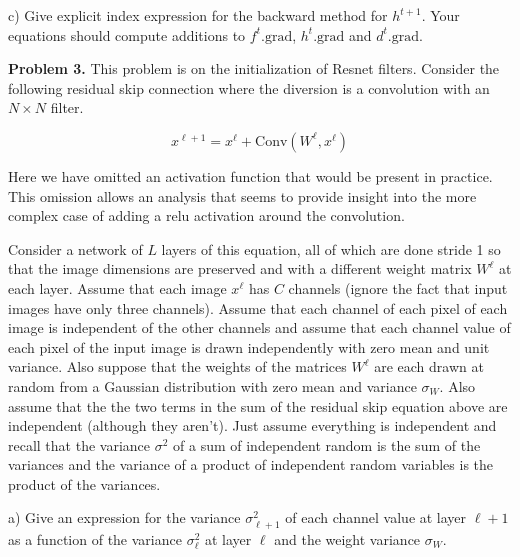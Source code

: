 \documentclass{article}
\newcommand{\solution}[1]{}
\begin{document}
c) Give explicit index expression for the backward method for $h^{t+1}$.  Your equations should
compute additions to $f^t.\mathrm{grad}$, $h^t.\mathrm{grad}$ and $d^t.\mathrm{grad}$. 

\solution{
\begin{eqnarray*}
f^t.\mathrm{grad}[b,c] \;\pluseq\; f^{t+1}.\mathrm{grad}[b,c](h^t[b,c] - d^t[b,c]) \\
\\
h^t.\mathrm{grad}[b,c] \;\pluseq\; f^{t+1}.\mathrm{grad}[b,c]f^t[b,c] \\
\\
d^t.\mathrm{grad}[b,c] \;\pluseq\; f^{t+1}.\mathrm{grad}[b,c](1-f^t[b,c])
\end{eqnarray*}
}

\bigskip
{\bf Problem 3.} This problem is on the initialization of Resnet filters.
Consider the following residual skip connection where the diversion is a convolution with an $N \times N$ filter.

$$x^{\ell+1} = x^\ell + \mathrm{Conv}(W^\ell,x^\ell)$$

Here we have omitted an activation function that would be present in practice.  This omission allows an analysis that seems to provide insight
into the more complex case of adding a relu activation around the convolution.

Consider a network of $L$ layers of this equation, all of which are done stride 1 so that the image dimensions are preserved and
with a different weight matrix $W^\ell$ at each layer.  Assume that each image $x^\ell$ has $C$ channels
(ignore the fact that input images have only three channels). Assume that each channel of each pixel of each image is independent of the other channels
and assume that each channel value of each pixel of the input image is drawn independently with zero mean and unit variance.
Also suppose that the weights of the matrices $W^\ell$ are each drawn at random
from a Gaussian distribution
with zero mean and variance $\sigma_W$. Also assume that the the two terms
in the sum of the residual skip equation above are independent (although they aren't).  Just assume everything is independent and recall that the variance $\sigma^2$ of
a sum of independent random is the sum of the variances and the variance of a product of independent random variables is the product of the variances.

a) Give an expression for
the variance $\sigma^2_{\ell+1}$ of each channel value at layer $\ell+1$ as a function of the variance $\sigma^2_\ell$ at layer $\ell$ and
the weight variance $\sigma_W$.
\end{document}
